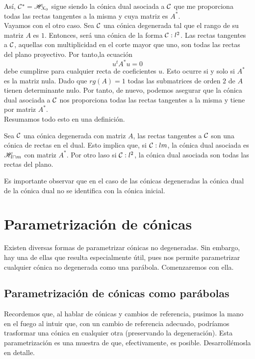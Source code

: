 Así, $\mathcal{C}^*=\mathscr{H}_{X_0}$ sigue siendo la cónica dual asociada a $\mathcal{C}$ que me proporciona todas las rectas tangentes a la misma y cuya matriz es $A^*$.\\

Vayamos con el otro caso. Sea $\mathcal{C}$ una cónica degenerada tal que el rango de su matriz $A$ es $1$. Entonces, será una cónica de la forma $\mathcal{C}:l^2$. Las rectas tangentes a $\mathcal{C}$, aquellas con multiplicidad en el corte mayor que uno, son todas las rectas del plano proyectivo. Por tanto,la ecuación
\[u^tA^*u=0\]
debe cumplirse para cualquier recta de coeficientes $u$. Esto ocurre si y solo si $A^*$ es la matriz nula. Dado que $rg(A)=1$ todas las submatrices de orden $2$ de $A$ tienen determinante nulo. Por tanto, de nuevo, podemos asegurar que la cónica dual asociada a $\mathcal{C}$ nos proporciona todas las rectas tangentes a la misma y tiene por matriz $A^*$.\\

Resumamos todo esto en una definición.
\begin{defi}
	Sea $\mathcal{C}$ una cónica degenerada con matriz $A$, las rectas tangentes a $\mathcal{C}$ son una cónica de rectas en el dual. Esto implica que, si $\mathcal{C}:lm$, la cónica dual asociada es $\mathscr{H}_{l\cap m}$ con matriz $A^*$. Por otro laso si $\mathcal{C}:l^2$, la cónica dual asociada son todas las rectas del plano.
\end{defi}
\begin{obs}
	Es importante observar que en el caso de las cónicas degeneradas la cónica dual de la cónica dual no se identifica con la cónica inicial.
\end{obs}

\section{Parametrización de cónicas}
Existen diversas formas de parametrizar cónicas no degeneradas. Sin embargo, hay una de ellas que resulta especialmente útil, pues nos permite parametrizar cualquier cónica no degenerada como una parábola. Comenzaremos con ella.
\subsection{Parametrización de cónicas como parábolas}
\label{C8_subsec_parametrizacion_como_parabola}
Recordemos que, al hablar de cónicas y cambios de referencia, pusimos la mano en el fuego al intuir que, con un cambio de referencia adecuado, podríamos trasformar una cónica en cualquier otra (preservando la degeneración). Esta parametrización es una muestra de que, efectivamente, es posible. Desarrollémosla en detalle.\\

